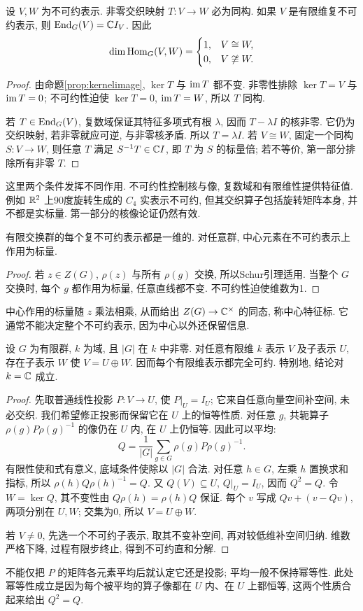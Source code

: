 \begin{theorem}[Schur引理]\label{thm:schur}
设 $V,W$ 为不可约表示. 非零交织映射 $T:V\to W$ 必为同构. 如果 $V$ 是有限维复不可约表示, 则 $\operatorname{End}_G(V)=\mathbb C I_V$. 因此
\[
 \dim\operatorname{Hom}_G(V,W)=\begin{cases}1,&V\cong W,\\0,&V\not\cong W.\end{cases}
\]
\end{theorem}
\begin{proof}
由命题\ref{prop:kernelimage}, $\ker T$ 与 $\operatorname{im} T$ 都不变. 非零性排除 $\ker T=V$ 与 $\operatorname{im} T=0$; 不可约性迫使 $\ker T=0$, $\operatorname{im} T=W$, 所以 $T$ 同构.

若 $T\in\operatorname{End}_G(V)$, 复数域保证其特征多项式有根 $\lambda$, 因而 $T-\lambda I$ 的核非零. 它仍为交织映射, 若非零就应可逆, 与非零核矛盾. 所以 $T=\lambda I$. 若 $V\cong W$, 固定一个同构 $S:V\to W$, 则任意 $T$ 满足 $S^{-1}T\in\mathbb C I$, 即 $T$ 为 $S$ 的标量倍; 若不等价, 第一部分排除所有非零 $T$.
\end{proof}
这里两个条件发挥不同作用. 不可约性控制核与像, 复数域和有限维性提供特征值. 例如 $\mathbb R^2$ 上90度旋转生成的 $C_4$ 实表示不可约, 但其交织算子包括旋转矩阵本身, 并不都是实标量. 第一部分的核像论证仍然有效.

\begin{corollary}\label{cor:abelian}
有限交换群的每个复不可约表示都是一维的. 对任意群, 中心元素在不可约表示上作用为标量.
\end{corollary}
\begin{proof}
若 $z\in Z(G)$, $\rho(z)$ 与所有 $\rho(g)$ 交换, 所以Schur引理适用. 当整个 $G$ 交换时, 每个 $g$ 都作用为标量, 任意直线都不变. 不可约性迫使维数为1.
\end{proof}
中心作用的标量随 $z$ 乘法相乘, 从而给出 $Z(G)\to\mathbb C^\times$ 的同态, 称中心特征标. 它通常不能决定整个不可约表示, 因为中心以外还保留信息.

\begin{theorem}[Maschke定理]\label{thm:maschke}
设 $G$ 为有限群, $k$ 为域, 且 $|G|$ 在 $k$ 中非零. 对任意有限维 $k$ 表示 $V$ 及子表示 $U$, 存在子表示 $W$ 使 $V=U\oplus W$. 因而每个有限维表示都完全可约. 特别地, 结论对 $k=\mathbb C$ 成立.
\end{theorem}
\begin{proof}
先取普通线性投影 $P:V\to U$, 使 $P|_U=I_U$; 它来自任意向量空间补空间, 未必交织. 我们希望修正投影而保留它在 $U$ 上的恒等性质. 对任意 $g$, 共轭算子 $\rho(g)P\rho(g)^{-1}$ 的像仍在 $U$ 内, 在 $U$ 上仍恒等. 因此可以平均:
\[
 Q=\frac1{|G|}\sum_{g\in G}\rho(g)P\rho(g)^{-1}.
\]
有限性使和式有意义, 底域条件使除以 $|G|$ 合法. 对任意 $h\in G$, 左乘 $h$ 置换求和指标, 所以 $\rho(h)Q\rho(h)^{-1}=Q$. 又 $Q(V)\subseteq U$, $Q|_U=I_U$, 因而 $Q^2=Q$. 令 $W=\ker Q$, 其不变性由 $Q\rho(h)=\rho(h)Q$ 保证. 每个 $v$ 写成 $Qv+(v-Qv)$, 两项分别在 $U,W$; 交集为0, 所以 $V=U\oplus W$.

若 $V\ne0$, 先选一个不可约子表示, 取其不变补空间, 再对较低维补空间归纳. 维数严格下降, 过程有限步终止, 得到不可约直和分解.
\end{proof}
不能仅把 $P$ 的矩阵各元素平均后就认定它还是投影; 平均一般不保持幂等性. 此处幂等性成立是因为每个被平均的算子像都在 $U$ 内、在 $U$ 上都恒等, 这两个性质合起来给出 $Q^2=Q$.

